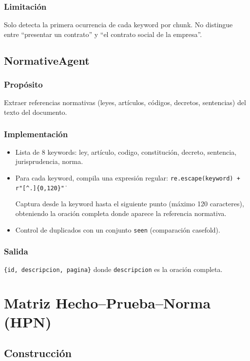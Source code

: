\documentclass[12pt, letterpaper]{article}
\begin{document}
\subsubsection*{Limitación}
Solo detecta la primera ocurrencia de cada keyword por chunk.
No distingue entre ``presentar un contrato'' y ``el contrato social
de la empresa''.

\subsection{NormativeAgent}

\subsubsection*{Propósito}
Extraer referencias normativas (leyes, artículos, códigos, decretos,
sentencias) del texto del documento.

\subsubsection*{Implementación}
\begin{itemize}[nosep]
  \item Lista de 8 keywords: ley, artículo, codigo, constitución,
    decreto, sentencia, jurisprudencia, norma.
  \item Para cada keyword, compila una expresión regular:
    \texttt{re.escape(keyword) + r"[\^{}.]\{0,120\}\."}

    Captura desde la keyword hasta el siguiente punto (máximo 120
    caracteres), obteniendo la oración completa donde aparece la
    referencia normativa.

  \item Control de duplicados con un conjunto \texttt{seen}
    (comparación casefold).
\end{itemize}

\subsubsection*{Salida}
\texttt{\{id, descripcion, pagina\}} donde
\texttt{descripcion} es la oración completa.

\newpage
\section{Matriz Hecho--Prueba--Norma (HPN)}

\subsection{Construcción}
\end{document}

